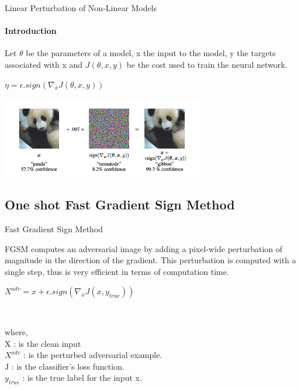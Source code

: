 \documentclass{beamer}
\begin{document}
\begin{darkframes}
    
    \begin{frame}{Linear Perturbation of Non-Linear Models}
    \framesubtitle{Introduction}
        
        Let $\theta$ be the parameters of a model, x the input to the model, y the targets associated with x and $J(\theta,x, y)$ be the cost used to train the neural network.
    
        \centerline{$\eta = \epsilon . sign(\nabla_{x}J(\theta,x, y))$}
        \begin{center}
        \includegraphics[width=3.5in]{panda.png}
        \end{center}
    
    \end{frame}
    
    \subsection{One shot Fast Gradient Sign Method}
    \begin{frame}{Fast Gradient Sign Method}
        
        FGSM computes an adversarial image by adding a pixel-wide perturbation of magnitude in the direction of the gradient. This perturbation is computed with a single step, thus is very efficient in terms of computation time.\\\bigskip
        
        \centerline{$X^{adv} = x + \epsilon . sign(\nabla_{x}J(x, y_{true}))$}\\\bigskip
        
        \begin{flushleft}
        where,\\
        X : is the clean input\\
        $X^{adv}$ : is the perturbed adversarial example.\\
        J : is the classifier's loss function.\\
        $y_{true}$ : is the true label for the input x.\\
        \end{flushleft}
        

\end{frame}
\end{darkframes}
\end{document}
